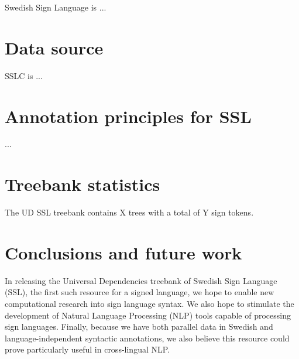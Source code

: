 \documentclass[11pt]{article}
\begin{document}
Swedish Sign Language is ...

\section{Data source}

SSLC is ...

\section{Annotation principles for SSL}

...

\section{Treebank statistics}

The UD SSL treebank contains X trees with a total of Y sign tokens.


\section{Conclusions and future work}

In releasing the Universal Dependencies treebank of Swedish Sign Language
(SSL), the first such resource for a signed language,
we hope to enable new computational research into sign language syntax.
We also hope to stimulate the development of Natural
Language Processing (NLP) tools capable of processing sign languages.
Finally, because we have both parallel data in Swedish and language-independent
syntactic annotations, we also believe this resource could prove particularly
useful in cross-lingual NLP.


%



\end{document}
